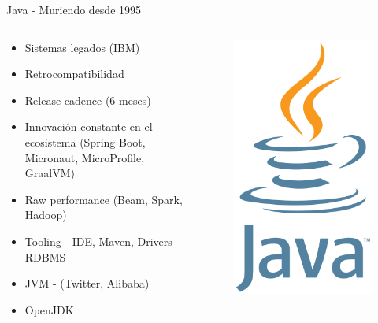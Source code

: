 \documentclass{beamer}
\begin{document}
\begin{frame}{Java - Muriendo desde 1995}
\begin{columns}
	\begin{column}{0.5\textwidth}
		\begin{itemize}
			\item Sistemas legados (IBM)
			\item Retrocompatibilidad
			\item Release cadence (6 meses)
			\item Innovación constante en el ecosistema (Spring Boot, Micronaut, MicroProfile, GraalVM)
			\item Raw performance (Beam, Spark, Hadoop)
			\item Tooling - IDE, Maven, Drivers RDBMS
			\item JVM - (Twitter, Alibaba)
			\item OpenJDK
		\end{itemize}
	\end{column}
	\begin{column}{0.5\textwidth}  %
		\begin{figure}
			\centering
			\includegraphics[width=0.7\linewidth]{Images/java}
		\end{figure}
	\end{column}
\end{columns}
\end{frame}
\end{document}
